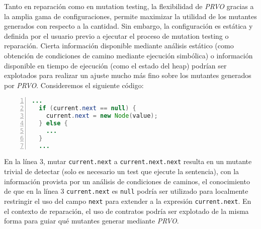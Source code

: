 Tanto en reparaci\'on como en mutation testing, la flexibilidad de \emph{PRVO} gracias a la amplia gama de configuraciones, permite maximizar la utilidad de los mutantes generados con respecto a la cantidad. Sin embargo, la configuraci\'on es est\'atica y definida por el usuario previo a ejecutar el proceso de mutation testing o reparaci\'on. Cierta informaci\'on disponible mediante an\'alisis est\'atico (como obtenci\'on de condiciones de camino mediante ejecuci\'on simb\'olica) o informaci\'on disponible en tiempo de ejecuci\'on (como el estado del heap) podr\'ian ser explotados para realizar un ajuste mucho m\'as fino sobre los mutantes generados por \emph{PRVO}. Consideremos el siguiente c\'odigo:
\begin{lstlisting}[frame=single, numbers=left, mathescape=true,language=Java,basicstyle={},framexleftmargin=.073\textwidth,xleftmargin=.085\textwidth,xrightmargin=0.012\textwidth]
  ...
  if (current.next == null) {
    current.next = new Node(value);
  } else {
    ...
  }
  ...
\end{lstlisting}
En la l\'inea $3$, mutar \texttt{current.next} a \texttt{current.next.next} resulta en un mutante trivial de detectar (solo es necesario un test que ejecute la sentencia), con la informaci\'on provista por un an\'alisis de condiciones de caminos, el conocimiento de que en la l\'inea $3$ \texttt{current.next} es \texttt{null} podr\'ia ser utilizado para localmente restringir el uso del campo \texttt{next} para extender a la expresi\'on \texttt{current.next}.
En el contexto de reparaci\'on, el uso de contratos podr\'ia ser explotado de la misma forma para guiar qu\'e mutantes generar mediante \emph{PRVO}.